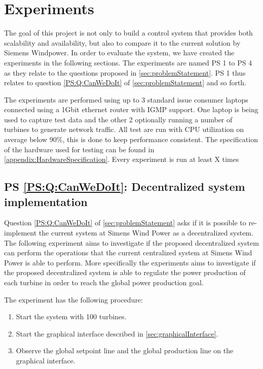 
\chapter{Experiments}

\newcommand{\failingTurbineNumbers}{1, 5, 10 and 30}
\newcommand{\testTurbineNumbers}{2, 21, 41, 61, 81 and 101}
\newcommand{\testCycletimeNumbers}{5ms, 10ms, 15ms, 20ms, 25ms and 30ms}
\newcommand{\experiemntRunTime}{2mins}

The goal of this project is not only to build a control system that provides both scalability and availability, but also to compare it to the current solution by Siemens Windpower. 
In order to evaluate the system, we have created the experiments in the following sections. 
The experiments are named PS 1 to PS 4 as they relate to the questions proposed in \cref{sec:problemStatement}.
PS 1 thus relates to question \ref{PS:Q:CanWeDoIt} of \cref{sec:problemStatement} and so forth.

The experiments are performed using up to 3 standard issue consumer laptops connected using a 1Gbit ethernet router with IGMP support.
One laptop is being used to capture test data and the other 2 optionally running a number of turbines to generate network traffic.
All test are run with CPU utilization on average below 90\%, this is done to keep performance consistent.
The specification of the hardware used for testing can be found in \cref{appendix:HardwareSpecification}.
Every experiment is run at least X times 

\section{PS \ref{PS:Q:CanWeDoIt}: Decentralized system implementation}

Question \ref{PS:Q:CanWeDoIt} of \cref{sec:problemStatement} asks if it is possible to re-implement the current system at Simens Wind Power as a decentralized system. The following experiment aims to investigate if the proposed decentralized system can perform the operations that the current centralized system at Simens Wind Power is able to perform. More specifically the experiments aims to investigate if the proposed decentralized system is able to regulate the power production of each turbine in order to reach the global power production goal.

The experiment has the following procedure:
\begin{enumerate}
	\item Start the system with 100 turbines.
	\item Start the graphical interface described in \cref{sec:graphicalInterface}.
	\item Observe the global setpoint line and the global production line on the graphical interface.
\end{enumerate}

